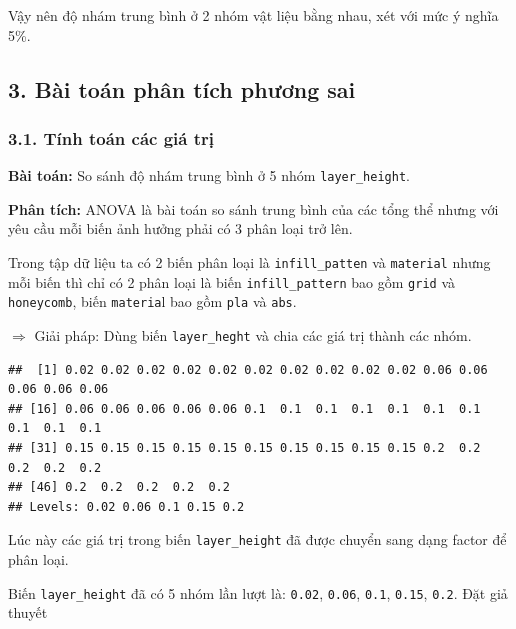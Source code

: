 Vậy nên độ nhám trung bình ở 2 nhóm vật liệu bằng nhau, xét với mức ý
nghĩa 5\%.

\subsection{3. Bài toán phân tích phương sai}

\subsubsection{3.1. Tính toán các giá trị}

\textbf{Bài toán:} So sánh độ nhám trung bình ở 5 nhóm
\texttt{layer\_height}.

\textbf{Phân tích:} ANOVA là bài toán so sánh trung bình của các tổng
thể nhưng với yêu cầu mỗi biến ảnh hưởng phải có 3 phân loại trở lên.

Trong tập dữ liệu ta có 2 biến phân loại là \texttt{infill\_patten} và
\texttt{material} nhưng mỗi biến thì chỉ có 2 phân loại là biến
\texttt{infill\_pattern} bao gồm \texttt{grid} và \texttt{honeycomb},
biến \texttt{materia}l bao gồm \texttt{pla} và \texttt{abs}.

\(\Rightarrow\) Giải pháp: Dùng biến \texttt{layer\_heght} và chia các giá trị thành
các nhóm.

\begin{Shaded}
\begin{Highlighting}[]
\SpecialCharTok{$}\OtherTok{\textless{}{-}} \SpecialCharTok{$}
\SpecialCharTok{$}
\end{Highlighting}
\end{Shaded}

\begin{verbatim}
##  [1] 0.02 0.02 0.02 0.02 0.02 0.02 0.02 0.02 0.02 0.02 0.06 0.06 0.06 0.06 0.06
## [16] 0.06 0.06 0.06 0.06 0.06 0.1  0.1  0.1  0.1  0.1  0.1  0.1  0.1  0.1  0.1 
## [31] 0.15 0.15 0.15 0.15 0.15 0.15 0.15 0.15 0.15 0.15 0.2  0.2  0.2  0.2  0.2 
## [46] 0.2  0.2  0.2  0.2  0.2 
## Levels: 0.02 0.06 0.1 0.15 0.2
\end{verbatim}

Lúc này các giá trị trong biến \texttt{layer\_height} đã được chuyển
sang dạng factor để phân loại.

Biến \texttt{layer\_height} đã có 5 nhóm lần lượt là: \texttt{0.02},
\texttt{0.06}, \texttt{0.1}, \texttt{0.15}, \texttt{0.2}. Đặt giả thuyết

